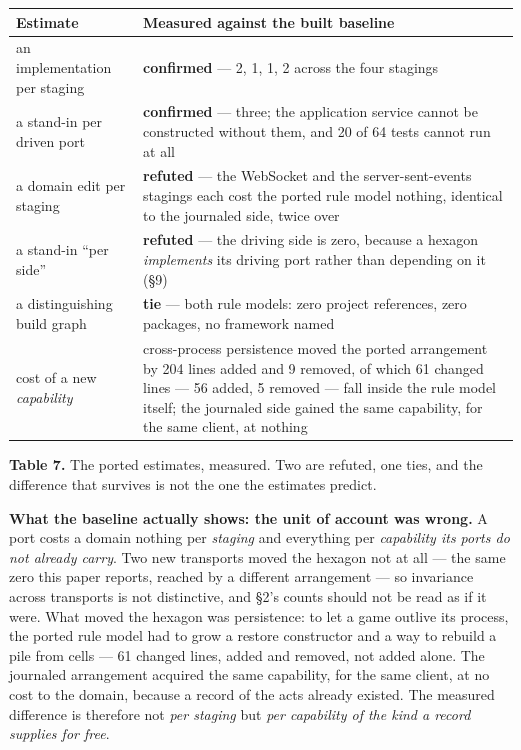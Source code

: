\documentclass[
]{article}
\newcounter{none} %
\begin{document}
{\def\LTcaptype{none} %
\begin{longtable}[]{@{}
  >{\raggedright\arraybackslash}p{}
  >{\raggedright\arraybackslash}p{}@{}}
\toprule\noalign{}
\begin{minipage}[b]{\linewidth}\raggedright
Estimate
\end{minipage} & \begin{minipage}[b]{\linewidth}\raggedright
Measured against the built baseline
\end{minipage} \\
\midrule\noalign{}
\endhead
\bottomrule\noalign{}
\endlastfoot
an implementation per staging & \textbf{confirmed} --- 2, 1, 1, 2 across
the four stagings \\
a stand-in per driven port & \textbf{confirmed} --- three; the
application service cannot be constructed without them, and 20 of 64
tests cannot run at all \\
a domain edit per staging & \textbf{refuted} --- the WebSocket and the
server-sent-events stagings each cost the ported rule model nothing,
identical to the journaled side, twice over \\
a stand-in ``per side'' & \textbf{refuted} --- the driving side is zero,
because a hexagon \emph{implements} its driving port rather than
depending on it (§9) \\
a distinguishing build graph & \textbf{tie} --- both rule models: zero
project references, zero packages, no framework named \\
cost of a new \emph{capability} & cross-process persistence moved the
ported arrangement by 204 lines added and 9 removed, of which 61 changed
lines --- 56 added, 5 removed --- fall inside the rule model itself; the
journaled side gained the same capability, for the same client, at
nothing \\
\end{longtable}
}

\textbf{Table 7.} The ported estimates, measured. Two are refuted, one
ties, and the difference that survives is not the one the estimates
predict.

\textbf{What the baseline actually shows: the unit of account was
wrong.} A port costs a domain nothing per \emph{staging} and everything
per \emph{capability its ports do not already carry}. Two new transports
moved the hexagon not at all --- the same zero this paper reports,
reached by a different arrangement --- so invariance across transports
is not distinctive, and §2's counts should not be read as if it were.
What moved the hexagon was persistence: to let a game outlive its
process, the ported rule model had to grow a restore constructor and a
way to rebuild a pile from cells --- 61 changed lines, added and
removed, not added alone. The journaled arrangement acquired the same
capability, for the same client, at no cost to the domain, because a
record of the acts already existed. The measured difference is therefore
not \emph{per staging} but \emph{per capability of the kind a record
supplies for free}.
\end{document}
